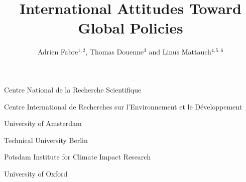 \documentclass{nature}
\title{International Attitudes Toward Global Policies %
}
\author{Adrien Fabre$^{1,2}$, Thomas Douenne$^3$ and Linus Mattauch$^{4,5,6}$} %
\begin{document}
\maketitle

\begin{center}
\end{center}


\begin{affiliations}
\item Centre National de la Recherche Scientifique
\item Centre International de Recherches sur l'Environnement et le Développement
\item University of Amsterdam
\item Technical University Berlin
\item Potsdam Institute for Climate Impact Research 
\item University of Oxford
\end{affiliations}
\end{document}
